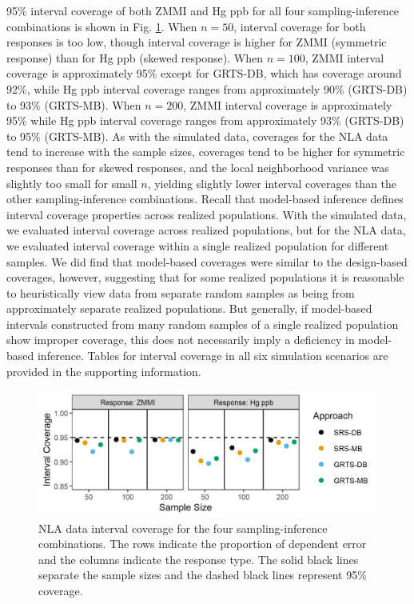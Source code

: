\documentclass[]{elsarticle} %
\begin{document}
95\% interval coverage of both ZMMI and Hg ppb for all four
sampling-inference combinations is shown in Fig. \ref{fig:data_figconf}.
When \(n = 50\), interval coverage for both responses is too low, though
interval coverage is higher for ZMMI (symmetric response) than for Hg
ppb (skewed response). When \(n = 100\), ZMMI interval coverage is
approximately 95\% except for GRTS-DB, which has coverage around 92\%,
while Hg ppb interval coverage ranges from approximately 90\% (GRTS-DB)
to 93\% (GRTS-MB). When \(n = 200\), ZMMI interval coverage is
approximately 95\% while Hg ppb interval coverage ranges from
approximately 93\% (GRTS-DB) to 95\% (GRTS-MB). As with the simulated
data, coverages for the NLA data tend to increase with the sample sizes,
coverages tend to be higher for symmetric responses than for skewed
responses, and the local neighborhood variance was slightly too small
for small \(n\), yielding slightly lower interval coverages than the
other sampling-inference combinations. Recall that model-based inference
defines interval coverage properties across realized populations. With
the simulated data, we evaluated interval coverage across realized
populations, but for the NLA data, we evaluated interval coverage within
a single realized population for different samples. We did find that
model-based coverages were similar to the design-based coverages,
however, suggesting that for some realized populations it is reasonable
to heuristically view data from separate random samples as being from
approximately separate realized populations. But generally, if
model-based intervals constructed from many random samples of a single
realized population show improper coverage, this does not necessarily
imply a deficiency in model-based inference. Tables for interval
coverage in all six simulation scenarios are provided in the supporting
information.

\begin{figure}
  \centering
  \includegraphics[width = 1\linewidth]{figures/data_coverage.jpeg}
  \caption{NLA data interval coverage for the four sampling-inference combinations. The rows indicate the proportion of dependent error and the columns indicate the response type. The solid black lines separate the sample sizes and the dashed black lines represent 95\% coverage.}
  \label{fig:data_figconf}
\end{figure}
\end{document}
